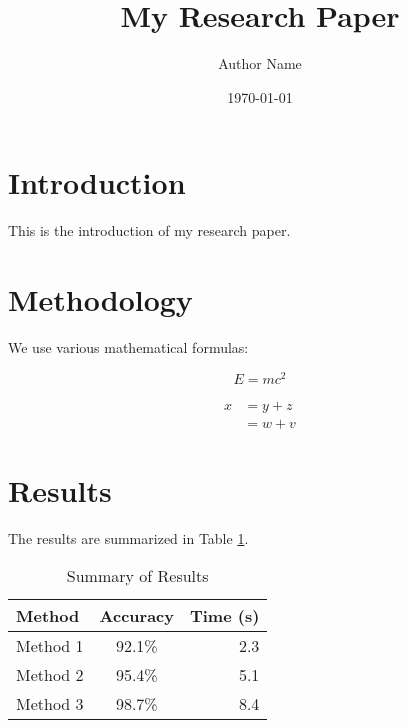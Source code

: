 \documentclass{article}
\title{My Research Paper}
\author{Author Name}
\date{\today}
\begin{document}
\maketitle

\section{Introduction}
This is the introduction of my research paper.

\section{Methodology}
We use various mathematical formulas:

\begin{equation}
E = mc^2
\end{equation}

\begin{align}
x &= y + z\\
&= w + v
\end{align}

\section{Results}
The results are summarized in Table \ref{tab:results}.

\begin{table}[h]
  \centering
  \caption{Summary of Results}
  \label{tab:results}
  \begin{tabular}{lcr}
    \hline
    Method & Accuracy & Time (s) \\
    \hline
    Method 1 & 92.1\% & 2.3 \\
    Method 2 & 95.4\% & 5.1 \\
    Method 3 & 98.7\% & 8.4 \\
    \hline
  \end{tabular}
\end{table}
\end{document}
